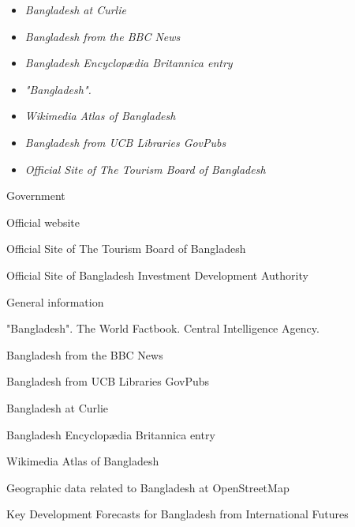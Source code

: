 \begin{itemize}
\item
  \emph{Bangladesh at Curlie}
\item
  \emph{Bangladesh from the BBC News}
\item
  \emph{Bangladesh Encyclopædia Britannica entry}
\item
  \emph{"Bangladesh".}
\item
  \emph{Wikimedia Atlas of Bangladesh}
\item
  \emph{Bangladesh from UCB Libraries GovPubs}
\item
  \emph{Official Site of The Tourism Board of Bangladesh}
\end{itemize}

Government

Official website

Official Site of The Tourism Board of Bangladesh

Official Site of Bangladesh Investment Development Authority

General information

"Bangladesh". The World Factbook. Central Intelligence Agency.

Bangladesh from the BBC News

Bangladesh from UCB Libraries GovPubs

Bangladesh at Curlie

Bangladesh Encyclopædia Britannica entry

Wikimedia Atlas of Bangladesh

Geographic data related to Bangladesh at OpenStreetMap

Key Development Forecasts for Bangladesh from International Futures

